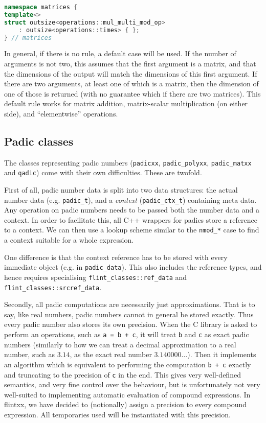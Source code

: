 \documentclass[a4paper,10pt]{book}
\newcommand{\code}{\lstinline}
\begin{document}
{{\begin{lstlisting}[language=c++]
namespace matrices {
template<>
struct outsize<operations::mul_multi_mod_op>
    : outsize<operations::times> { };
} // matrices
\end{lstlisting}

In general, if there is no rule, a default case will be used. If the number of
arguments is not two, this assumes that the first argument is a matrix, and that
the dimensions of the output will match the dimensions of this first argument.
If there are two arguments, at least one of which is a matrix, then the
dimension of one of those is returned (with no guarantee which if there are two
matrices). This default rule works for matrix addition, matrix-scalar
multiplication (on either side), and ``elementwise'' operations.

\subsection{Padic classes}

The classes representing padic numbers (\code{padicxx}, \code{padic_polyxx},
\code{padic_matxx} and \code{qadic}) come with their own difficulties. These are
twofold.

First of all, padic number data is split into two data structures: the actual
number data (e.g. \code{padic_t}), and a \emph{context} (\code{padic_ctx_t})
containing meta data.
Any operation on padic numbers needs to be passed both the number data and a
context. In order to facilitate this, all C++ wrappers for padics store a
reference to a context. We can then use a lookup scheme similar to the
\code{nmod_*} case to find a context suitable for a whole expression.

One difference is that the context reference has to be stored with every
immediate object (e.g. in \code{padic_data}). This also includes the reference
types, and hence requires specialising \code{flint_classes::ref_data} and
\code{flint_classes::srcref_data}.

Secondly, all padic computations are necessarily just approximations. That is to
say, like real numbers, padic numbers cannot in general be stored exactly. Thus
every padic number also stores its own precision. When the C library is asked to
perform an operations, such as \code{a = b + c}, it will treat \code{b} and
\code{c} as exact padic numbers (similarly to how we can treat a decimal
approximation to a real number, such as $3.14$, as the exact real number
$3.140000\dots$). Then it implements an algorithm which is equivalent to
performing the computation \code{b + c} exactly and truncating to the precision
of \code{c} in the end. This gives very well-defined semantics, and very fine
control over the behaviour, but is unfortunately not very well-suited to
implementing automatic evaluation of compound expressions. In flintxx, we have
decided to (notionally) assign a precision to every compound expression. All
temporaries used will be instantiated with this precision.

}}
\end{document}
